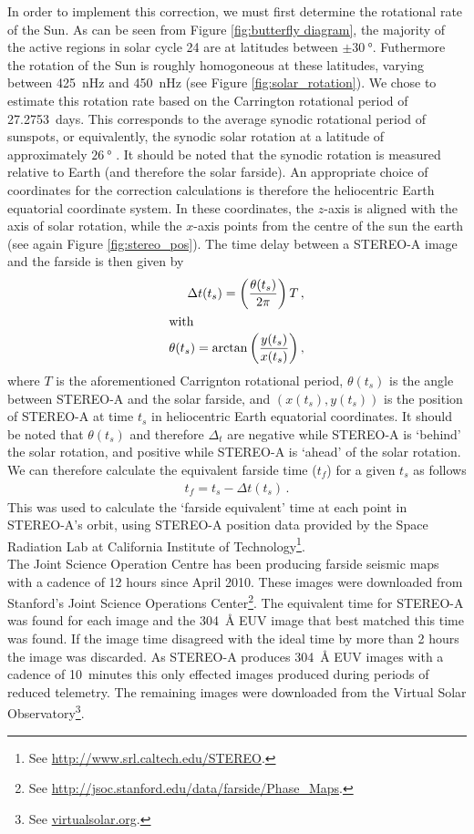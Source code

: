 \documentclass[11pt,a4paper,onecolumn]{report}
\begin{document}
In order to implement this correction, we must first determine the rotational
rate of the Sun. As can be seen from Figure \ref{fig:butterfly diagram}, the
majority of the active regions in solar cycle 24 are at latitudes between $\pm
\SI{30}{\degree}$. Futhermore the rotation of the Sun is roughly homogoneous at
these latitudes, varying between \SI{425}{nHz} and \SI{450}{nHz} (see Figure
\ref{fig:solar_rotation}). We chose to estimate this rotation rate based on the
Carrington rotational period of \SI{27.2753}{days}. This corresponds to the
average synodic rotational period of sunspots, or equivalently, the synodic
solar rotation at a latitude of approximately \(\SI[]{26}[]{\degree}\)
\citep{carrington_observations_1863}. It should be noted that the synodic
rotation is measured relative to Earth (and therefore the solar farside). An
appropriate choice of coordinates for the correction calculations is therefore
the heliocentric Earth equatorial coordinate system. In these coordinates, the
$z$-axis is aligned with the axis of solar rotation, while the $x$-axis points
from the centre of the sun the earth (see again Figure \ref{fig:stereo_pos}).
The time delay between a STEREO-A image and the farside is then given by
\begin{align}
  \Delta t(t_s) = \left(\frac{\theta(t_s)}{2\pi}\right)T \, ,\\
  \intertext{with}
  \theta(t_s) = \arctan{\left(\frac{y(t_s)}{x(t_s)}\right)} \, ,
\end{align}
where $T$ is the aforementioned Carrignton rotational period, $\theta(t_s)$ is
the angle between STEREO-A and the solar farside, and $(x(t_s), y(t_s))$ is the
position of STEREO-A at time $t_s$ in heliocentric Earth equatorial coordinates.
It should be noted that $\theta(t_s)$ and therefore $\Delta_t$ are negative
while STEREO-A is `behind' the solar rotation, and positive while STEREO-A is
`ahead' of the solar rotation. We can therefore calculate the equivalent farside
time ($t_f$) for a given $t_s$ as follows
\begin{align}
  t_f = t_s - \Delta t(t_s) \, .
\end{align}
This was used to calculate the `farside equivalent' time at each point in
STEREO-A's orbit, using STEREO-A position data provided by the Space Radiation
Lab at California Institute of Technology\footnote{See
\url{http://www.srl.caltech.edu/STEREO}.}. \\

The Joint Science Operation Centre has been producing farside seismic maps with
a cadence of 12 hours since April 2010. These images were downloaded from
Stanford's Joint Science Operations Center\footnote{See
\url{http://jsoc.stanford.edu/data/farside/Phase_Maps}.}. The equivalent time
for STEREO-A was found for each image and the \SI{304}{\angstrom} EUV image that
best matched this time was found. If the image time disagreed with the ideal
time by more than 2 hours the image was discarded. As STEREO-A produces
\SI{304}{\angstrom} EUV images with a cadence of \SI{10}{minutes} this only
effected images produced during periods of reduced telemetry. The remaining
images were downloaded from the Virtual Solar Observatory\footnote{See
\url{virtualsolar.org}.}. \\
\end{document}
